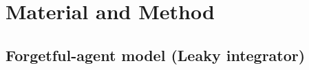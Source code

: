 \documentclass[profile,final,english, draft]{article}%
\begin{document}
\section{Material and Method}

\subsection{Forgetful-agent model (Leaky integrator)}
%
%
%
%
%
\end{document}
